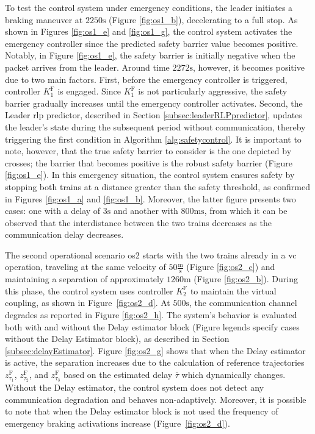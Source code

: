 \documentclass[letterpaper, 10 pt, conference]{ieeeconf}
\theoremstyle{definition}
\theoremstyle{nopoint}
\newcommand{\tildeAdd}{~}
\begin{document}
		To test the control system under emergency conditions, the leader initiates a braking maneuver at $2250\unit{\second}$ (Figure \ref{fig:os1_b}), decelerating to a full stop. As shown in Figures \ref{fig:os1_e} and \ref{fig:os1_g}, the control system activates the emergency controller since the predicted safety barrier value becomes positive. Notably, in Figure \ref{fig:os1_e}, the safety barrier is initially negative when the packet arrives from the leader. Around time \( 2272 \unit{\second} \), however, it becomes positive due to two main factors. First, before the emergency controller is triggered, controller $K_1^\mathrm{F}$ is engaged. Since $K_1^\mathrm{F}$ is not particularly aggressive, the safety barrier gradually increases until the emergency controller activates. Second, the Leader \gls{rlp} predictor, described in Section \ref{subsec:leaderRLPpredictor}, updates the leader's state during the subsequent period without communication, thereby triggering the first condition in Algorithm \ref{alg:safetycontrol}. It is important to note, however, that the true safety barrier to consider is the one depicted by crosses; the barrier that becomes positive is the robust safety barrier (Figure \ref{fig:os1_e}). In this emergency situation, the control system ensures safety by stopping both trains at a distance greater than the safety threshold, as confirmed in Figures \ref{fig:os1_a} and \ref{fig:os1_b}. Moreover, the latter figure presents two cases: one with a delay of $3 \unit{\second}$ and another with $800  \unit{\milli\second}$, from which it can be observed that the interdistance between the two trains decreases as the communication delay decreases.
		
		The second operational scenario \gls{os}2 starts with the two trains already in a \gls{vc} operation, traveling at the same velocity of $50 \frac{\unit{\meter}}{\unit{\second}}$ (Figure \ref{fig:os2_c}) and maintaining a separation of approximately $1260 \unit{\meter}$ (Figure \ref{fig:os2_b}). During this phase, the control system uses controller $K_2^\mathrm{F}$ to maintain the virtual coupling, as shown in Figure\tildeAdd\ref{fig:os2_d}. At $500\unit{\second}$, the communication channel degrades as reported in Figure \ref{fig:os2_h}. The system’s behavior is evaluated both with and without the Delay estimator block (Figure legends specify cases without the Delay Estimator block), as described in Section \ref{subsec:delayEstimator}. Figure \ref{fig:os2_g} shows that when the Delay estimator is active, the separation increases due to the calculation of reference trajectories $z_{\tau_1}^\mathrm{F}$, $z_{\tau_2}^\mathrm{F}$, and $z_{\tau_3}^\mathrm{F}$ based on the estimated delay $\bar{\tau}$ which dynamically changes. Without the Delay estimator, the control system does not detect any communication degradation and behaves non-adaptively. Moreover, it is possible to note that when the Delay estimator block is not used the frequency of emergency braking activations increase (Figure\tildeAdd\ref{fig:os2_d}).
		
\end{document}
